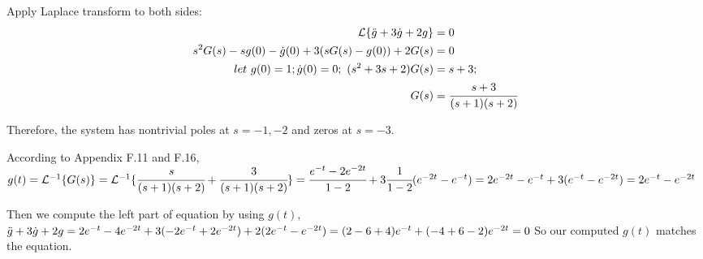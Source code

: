 \documentclass[12pt,a4paper]{article}
\begin{document}
\newpage
{}
Apply Laplace transform to both sides: \\
\begin{align*}
    \mathcal{L}\{\ddot{g}+3\dot{g}+2g\} &= 0\\
    s^2G(s)-sg(0)-\dot{g}(0)+3(sG(s)-g(0))+2G(s) &=0\\
    let\ g(0)=1;\dot{g}(0)=0;\ (s^2+3s+2)G(s)&=s+3;\\
    G(s) &= \cfrac{s+3}{(s+1)(s+2)}
\end{align*}

Therefore, the system has nontrivial poles at $s=-1,-2$ and zeros at $s=-3$.

According to Appendix F.11 and F.16, \\
$g(t)=\mathcal{L}^{-1}\{G(s)\}=\mathcal{L}^{-1}\{\cfrac{s}{(s+1)(s+2)}+\cfrac{3}{(s+1)(s+2)}\}\\
=\cfrac{e^{-t}-2e^{-2t}}{1-2}+3\cfrac{1}{1-2}(e^{-2t}-e^{-t})\\
=2e^{-2t}-e^{-t}+3(e^{-t}-e^{-2t})\\
=2e^{-t}-e^{-2t}$

Then we compute the left part of equation by using $g(t)$, \\
$\ddot{g}+3\dot{g}+2g=2e^{-t}-4e^{-2t}+3(-2e^{-t}+2e^{-2t})+2(2e^{-t}-e^{-2t})\\
=(2-6+4)e^{-t}+(-4+6-2)e^{-2t}\\
=0$
So our computed $g(t)$ matches the equation. 
\end{document}
